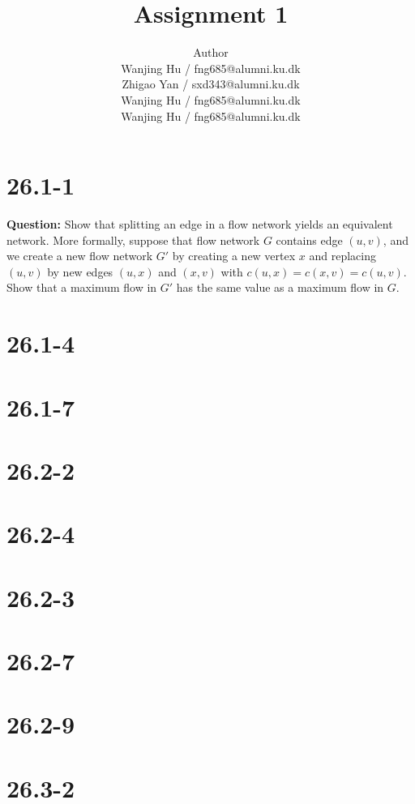 \documentclass[11pt]{article}
\title{Assignment 1}
\author{Author \\
  Wanjing Hu / fng685@alumni.ku.dk  \\
  Zhigao Yan / sxd343@alumni.ku.dk  \\
  Wanjing Hu / fng685@alumni.ku.dk  \\
  Wanjing Hu / fng685@alumni.ku.dk  \\
}
\begin{document}
\maketitle


\section{26.1-1}
\textbf{Question: }Show that splitting an edge in a flow network yields an equivalent network. More formally, suppose that flow network $G$ contains edge $(u, v)$, and we create a new flow network $G'$ by creating a new vertex $x$ and replacing $(u, v)$ by new edges $(u, x)$ and $(x, v)$ with $c(u, x) = c(x, v) = c(u, v)$. Show that a maximum flow in $G'$ has the same value as a maximum flow in $G$.

\section{26.1-4}

\section{26.1-7}
\section{26.2-2}
\section{26.2-4}
\section{26.2-3}
\section{26.2-7}
\section{26.2-9}
\section{26.3-2}
\end{document}
